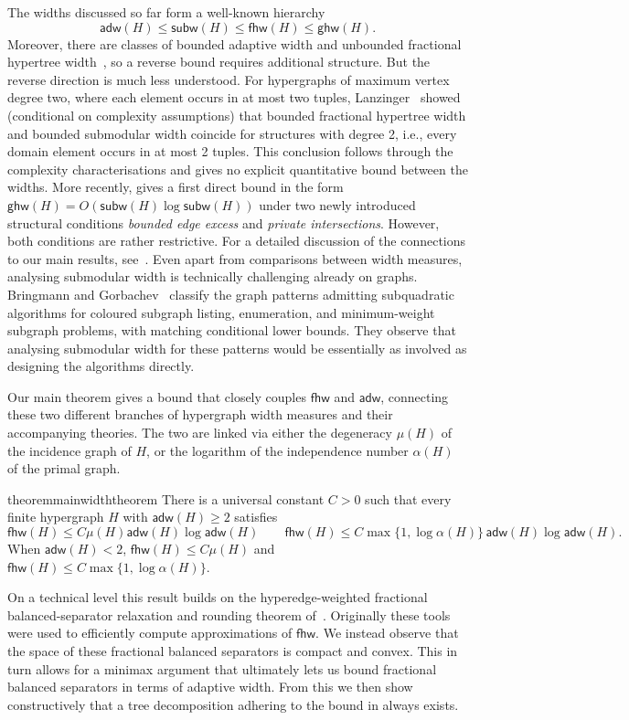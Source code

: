 \documentclass[11pt,letterpaper]{article}
\theoremstyle{definition}
\theoremstyle{remark}
\newcommand{\ghw}{\mathsf{ghw}}
\newcommand{\fhw}{\mathsf{fhw}}
\newcommand{\adw}{\mathsf{adw}}
\newcommand{\subw}{\mathsf{subw}}
\providecommand{\adw}{\operatorname{adw}}
\providecommand{\subw}{\operatorname{subw}}
\providecommand{\fhw}{\operatorname{fhw}}
\begin{document}
%
%
%
%
%
%
The widths discussed so far form a well-known hierarchy~\cite{adw,Marx13,fhw}
\[
 \adw(H)\le\subw(H)\le\fhw(H)\le\ghw(H).
\]
Moreover, there are
classes of bounded adaptive width and unbounded fractional hypertree
width~\cite{adw}, so a reverse bound requires additional structure.
But the reverse direction is much less understood. For hypergraphs of maximum vertex degree
two, where each element occurs in at most two tuples,
Lanzinger~\cite{LanzingerPODS22} showed (conditional on complexity assumptions) that bounded fractional
hypertree width and bounded submodular width coincide for structures with degree 2, i.e., every domain element occurs in at most 2 tuples. This conclusion follows through the complexity characterisations and gives no explicit quantitative bound between the widths. More recently, \cite{Lanzinger2026Cuts} gives a first direct bound in the form $\ghw(H) = O(\subw(H)\log \subw(H))$
under two newly introduced structural conditions \emph{bounded edge excess} and \emph{private intersections}. However, both conditions are rather restrictive. For a detailed discussion of the connections to our main results, see~. Even apart from comparisons between width measures, analysing submodular width is technically challenging already on graphs. Bringmann and Gorbachev~\cite{BringmannGorbachev2025} classify the graph patterns admitting subquadratic algorithms for coloured subgraph listing, enumeration, and minimum-weight subgraph problems, with matching conditional lower bounds. They observe that analysing submodular width for these patterns would be essentially as involved as designing the algorithms directly.

Our main theorem gives a bound that closely couples $\fhw$ and $\adw$, connecting these two different branches of hypergraph width measures and their accompanying theories. The two are linked via either the degeneracy $\mu(H)$ of the incidence graph of $H$, or the logarithm of the independence number $\alpha(H)$ of the primal graph.
\begin{restatable}{theorem}{mainwidththeorem}
\label{thm:intro-width}
There is a universal constant $C>0$ such that every finite hypergraph $H$
with $\adw(H)\ge2$ satisfies
\[
 \fhw(H)\le C\mu(H)\adw(H)\log\adw(H) \qquad \fhw(H)\le C\max\{1,\log\alpha(H)\}\, \adw(H)\log\adw(H).
\]
When $\adw(H)<2$, $\fhw(H)\le C\mu(H)$ and $\fhw(H)\le C\max\{1,\log\alpha(H)\}$.
\end{restatable}
On a technical level this result builds on the hyperedge-weighted fractional balanced-separator relaxation and rounding theorem of~\cite{KorchemnaEtAl2024}. Originally these tools were used to efficiently compute approximations of $\fhw$.
We instead observe that the space of these fractional balanced separators is compact and convex. This in turn allows for a minimax argument that ultimately lets us bound fractional balanced separators in terms of adaptive width. From this we then show constructively that a tree decomposition adhering to the bound in  always exists.
\end{document}
